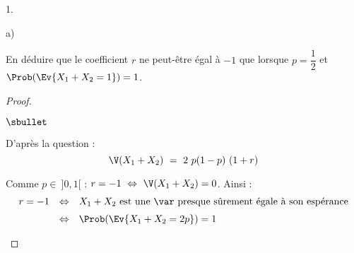 \begin{noliste}{1.}
\begin{noliste}{a)}
  \item En déduire que le coefficient $r$ ne peut-être égal à $-1$ que
    lorsque $p = \dfrac{1}{2}$ et $\Prob(\Ev{X_1 + X_2 = 1}) = 1$.

    \begin{proof}~%
      \begin{noliste}{$\sbullet$}
      \item D'après la question  :
        \[
        \V(X_1 + X_2) \ = \ 2 \ p(1-p) \ (1 + r)
        \]
      \item Comme $p \in \ ]0,1[$ : $r = -1 \ \Leftrightarrow \ \V(X_1
        + X_2) = 0$. Ainsi :
        \[
        \begin{array}{rcl}
          r = -1 & \Leftrightarrow & \text{$X_1 + X_2$ est une \var
            presque sûrement égale à son espérance}
          \\[.2cm]
          & \Leftrightarrow & \Prob(\Ev{X_1 + X_2 = 2p}) = 1
        \end{array}
        \]


        \newpage



\end{noliste}
\end{proof}
\end{noliste}
\end{noliste}
